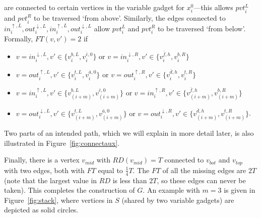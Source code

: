 \documentclass[envcountsame]{llncs}
\begin{document}
are connected to certain vertices in the variable gadget for $x_i^0$---this allows $\mathit{pvt}_i^L$ and $\mathit{pvt}_i^R$ to be traversed `from above'. Similarly,
the edges connected to ${in}_i^{\uparrow, L}, {out}_i^{\downarrow, L}, {in}_i^{\uparrow, L}, {out}_i^{\downarrow, L}$ allow $\mathit{pvt}_i^L$ and $\mathit{pvt}_i^R$ to be traversed `from below'.
Formally, $\mathit{FT}(v, v') = 2$ if
\begin{itemize}
\item $v = \mathit{in}^{\downarrow, L}_i, v' \in \{ v_i^{b, L}, v_i^{\bar{c}, 0} \} \text{ or } v = \mathit{in}^{\downarrow, R}_i, v' \in \{ v_i^{\bar{f}, h}, v_i^{b, R} \}$
\item $v = \mathit{out}^{\uparrow, L}_i, v' \in \{ v_i^{t, L}, v_i^{\bar{a}, 0} \} \text{ or } v = \mathit{out}^{\uparrow, R}_i, v' \in \{ v_i^{\bar{d}, h}, v_i^{t, R} \}$
\item $v = \mathit{in}^{\uparrow, L}_i, v' \in \{ v_{(i+m)}^{b, L}, v_{(i+m)}^{\bar{c}, 0} \} \text{ or } v = \mathit{in}^{\uparrow, R}_i, v' \in \{ v_{(i + m)}^{\bar{f}, h}, v_{(i + m)}^{b, R} \}$
\item $v = \mathit{out}^{\downarrow, L}_i, v' \in \{ v_{(i+m)}^{t, L}, v_{(i+m)}^{\bar{a}, 0} \} \text{ or } v = \mathit{out}^{\downarrow, R}_i, v' \in \{ v_{(i+m)}^{\bar{d}, h}, v_{(i+m)}^{t, R} \}$.
\end{itemize}
Two parts of an intended path, which we will explain in more detail later, is also illustrated in Figure~\ref{fig:connectaux}.

Finally, there is a vertex $v_{mid}$ with $\mathit{RD}(v_{mid}) = T$ connected to $v_{bot}$ and $v_{top}$
with two edges, both with $\mathit{FT}$ equal to $\frac{1}{4}T$.
The $\mathit{FT}$ of all the missing edges are $2T$
(note that the largest value in $\mathit{RD}$ is less than $2T$, so these edges can never be taken).
This completes the construction of $G$. An example with $m = 3$
is given in Figure~\ref{fig:stack}, where vertices in $S$ (shared by two variable gadgets) are depicted as solid circles.
\end{document}

